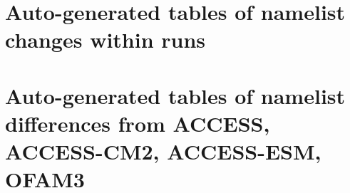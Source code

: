\documentclass[11pt]{article}
\newcommand{\nmldiffer}[1]{#1} %
\newcommand{\nmllink}[2]{#1} %
\newcommand{\doscript}[1]{{\footnotesize\textsf{}}}
\newcommand{\runchanges}[1]{\subsection{#1}%
\doscript{/Users/andy/anaconda/bin/python3 /Users/andy/bin/nmltab.py --format latex -dp raijin-rsync/g/data3/hh5/tmp/cosima/#1/*/ocean/input.nml}%
}
\begin{document}
\section{Auto-generated tables of namelist changes within runs}

\section{Auto-generated tables of namelist differences from ACCESS, ACCESS-CM2, ACCESS-ESM, OFAM3}\label{S:namelist-model-comparisons}
\end{document}
